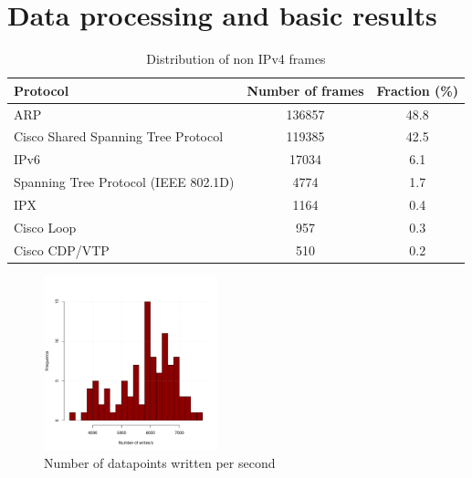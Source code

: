 \section{Data processing and basic results}
\label{section:results}

\begin{table}[h!]
  \caption{Distribution of non IPv4 frames}
  \label{tab:non:ipv4:frames}
  \centering
  \begin{tabular}{lcc}
    \hline
    {\bf Protocol}                                   & {\bf Number of frames } & {\bf Fraction (\%)} \\
    \hline
    ARP                                              & 136857                  & 48.8 \\
    Cisco Shared Spanning Tree Protocol              & 119385                  & 42.5 \\    
    IPv6                                             & 17034                   & 6.1  \\
    Spanning Tree Protocol (IEEE 802.1D)             & 4774                    & 1.7  \\
    IPX                                              & 1164                    & 0.4  \\
    Cisco Loop                                       & 957                     & 0.3  \\
    Cisco CDP/VTP                                    & 510                     & 0.2  \\
  \end{tabular}
\end{table}


\begin{figure}[!hbt]\centering
  \includegraphics[width=0.45\textwidth]{graphics/1tag.dist.write.pdf}
  \caption{Number of datapoints written per second}
  \label{fig:write:1tag}
\end{figure}

